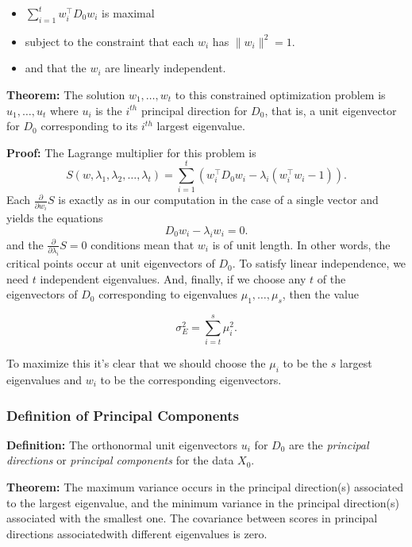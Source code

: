 \documentclass[
]{article}
\providecommand{\tightlist}{%
  \setlength{\itemsep}{0pt}\setlength{\parskip}{0pt}}
\begin{document}
\begin{itemize}
\tightlist
\item
  \(\sum_{i=1}^{t} w_{i}^{\intercal}D_{0}w_{i}\) is maximal
\item
  subject to the constraint that each \(w_{i}\) has \(\|w_{i}\|^2=1\).
\item
  and that the \(w_{i}\) are linearly independent.
\end{itemize}

\textbf{Theorem:} The solution \(w_{1},\ldots, w_{t}\) to this
constrained optimization problem is \(u_{1},\ldots, u_{t}\) where
\(u_{i}\) is the \(i^{th}\) principal direction for \(D_{0}\), that is,
a unit eigenvector for \(D_{0}\) corresponding to its \(i^{th}\) largest
eigenvalue.

\textbf{Proof:} The Lagrange multiplier for this problem is \[
S(w,\lambda_{1},\lambda_{2},\ldots, \lambda_{t}) = \sum_{i=1}^{t} (w_{i}^{\intercal}D_{0}w_{i} -\lambda_{i}(w_{i}^{\intercal}w_{i}-1)).
\] Each \(\frac{\partial}{\partial w_{i}} S\) is exactly as in our
computation in the case of a single vector and yields the equations \[
D_{0}w_{i}-\lambda_{i}w_{i}=0.
\] and the \(\frac{\partial}{\partial \lambda_{i}} S=0\) conditions mean
that \(w_{i}\) is of unit length. In other words, the critical points
occur at unit eigenvectors of \(D_{0}\). To satisfy linear independence,
we need \(t\) independent eigenvalues. And, finally, if we choose any
\(t\) of the eigenvectors of \(D_{0}\) corresponding to eigenvalues
\(\mu_{1},\ldots,\mu_{s}\), then the value

\[
\sigma_{E}^2 = \sum_{i=t}^{s} \mu_{i}^2.
\]

To maximize this it's clear that we should choose the \(\mu_{i}\) to be
the \(s\) largest eigenvalues and \(w_{i}\) to be the corresponding
eigenvectors.

\hypertarget{definition-of-principal-components}{%
\subsubsection{Definition of Principal
Components}\label{definition-of-principal-components}}

\textbf{Definition:} The orthonormal unit eigenvectors \(u_{i}\) for
\(D_{0}\) are the \emph{principal directions} or \emph{principal
components} for the data \(X_{0}\).

\textbf{Theorem:} The maximum variance occurs in the principal
direction(s) associated to the largest eigenvalue, and the minimum
variance in the principal direction(s) associated with the smallest one.
The covariance between scores in principal directions associatedwith
different eigenvalues is zero.
\end{document}

